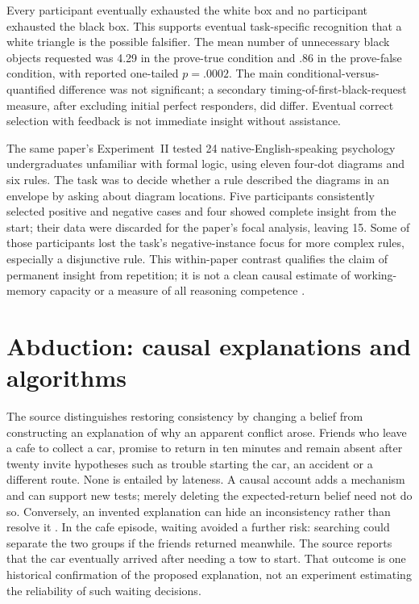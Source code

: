 Every participant eventually exhausted the white box and no participant
exhausted the black box. This supports eventual task-specific recognition
that a white triangle is the possible falsifier. The mean number of
unnecessary black objects requested was 4.29 in the prove-true condition
and .86 in the prove-false condition, with reported one-tailed
\(p=.0002\). The main conditional-versus-quantified difference was not
significant; a secondary timing-of-first-black-request measure, after
excluding initial perfect responders, did differ. Eventual correct
selection with feedback is not immediate insight without assistance.

The same paper's Experiment~II tested 24 native-English-speaking
psychology undergraduates unfamiliar with formal logic, using eleven
four-dot diagrams and six rules. The task was to decide whether a rule
described the diagrams in an envelope by asking about diagram locations.
Five participants consistently selected positive and negative cases and
four showed complete insight from the start; their data were discarded
for the paper's focal analysis, leaving 15. Some of those participants
lost the task's negative-instance focus for more complex rules,
especially a disjunctive rule. This within-paper contrast qualifies the
claim of permanent insight from repetition; it is not a clean causal
estimate of working-memory capacity or a measure of all reasoning
competence \cite[pp.~54--60]{JohnsonLairdWason1970Insight}.

\section{Abduction: causal explanations and algorithms}
\label{sec:p19-r23-abduction}

The source distinguishes restoring consistency by changing a belief from
constructing an explanation of why an apparent conflict arose. Friends
who leave a cafe to collect a car, promise to return in ten minutes and
remain absent after twenty invite hypotheses such as trouble starting
the car, an accident or a different route. None is entailed by lateness.
A causal account adds a mechanism and can support new tests; merely
deleting the expected-return belief need not do so. Conversely, an
invented explanation can hide an inconsistency rather than resolve it
\cite[pp.~154--155]{JohnsonLaird2021MentalModels}.
In the cafe episode, waiting avoided a further risk: searching could
separate the two groups if the friends returned meanwhile. The source
reports that the car eventually arrived after needing a tow to start.
That outcome is one historical confirmation of the proposed explanation,
not an experiment estimating the reliability of such waiting decisions.

